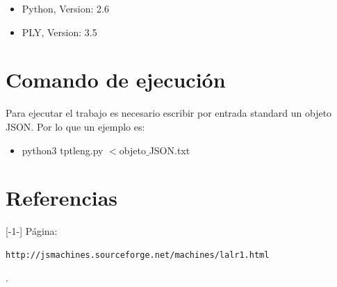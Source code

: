 \documentclass{article}
\begin{document}
\begin{itemize}
    \item Python, Version: 2.6
    \item PLY, Version: 3.5
\end{itemize}

\section{Comando de ejecución}
Para ejecutar el trabajo es necesario escribir por entrada standard un objeto JSON. Por lo que un ejemplo es:
\begin{itemize}
    \item python3 tptleng.py $<$objeto$\_$JSON.txt
\end{itemize}

\section{Referencias}
[-1-] Página: \begin{verbatim}http://jsmachines.sourceforge.net/machines/lalr1.html\end{verbatim}.
\end{document}
